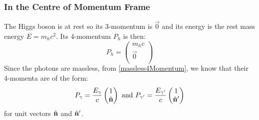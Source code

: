 \documentclass[../main.tex]{subfiles}
\begin{document}
\subsubsection{In the Centre of Momentum Frame}
The Higgs boson is at rest so its 3-momentum is $\vec{0}$ and its energy is the rest mass energy $E = m_h c^2$.
Its 4-momentum $P_h$ is then:
\[
  P_h = \begin{pmatrix}
  m_h c \\
  \vec{0} \\
  \end{pmatrix}
\]
Since the photons are massless, from \cref{massless4Momentum}, we know that their 4-momenta are of the form:
\[
  P_{\gamma} = \frac{E_{\gamma}}{c}\begin{pmatrix}
  1 \\
  \hat{\mathbf{\bm{n}}} \\
  \end{pmatrix} \text{ and }
  P_{\gamma'} = \frac{E_{\gamma'}}{c}\begin{pmatrix}
  1 \\
  \hat{\mathbf{\bm{n}}}' \\
  \end{pmatrix}
\]
for unit vectors $\hat{\mathbf{\bm{n}}}$ and $\hat{\mathbf{\bm{n}}}'$.
\end{document}
